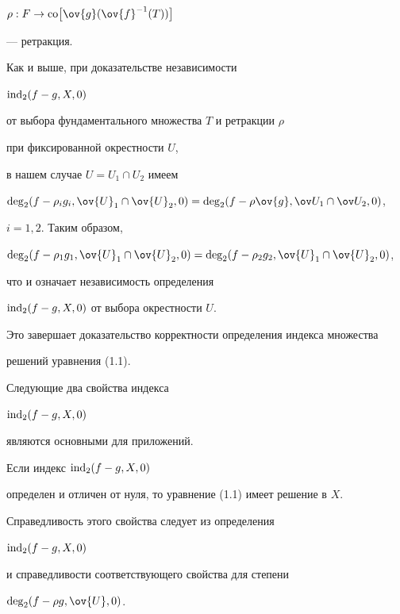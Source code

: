 $\rho : F \to\co  \bigl[\ov {g} (\ov {f}^{-1}(T)) \bigr]$


--- ретракция.


Как и выше, при доказательстве независимости 


$\operatorname{ind}_2 (f - g, X, 0)$


от выбора фундаментального множества $T$ и ретракции $\rho$


при фиксированной окрестности $U$,


в нашем случае $U = U_1 \cap U_2$ имеем


$\Deg_2 (f - \rho_i g_i, \ov {U}_1 \cap \ov {U}_2, 0) =


\Deg_2 (f - \rho \ov {g}, \ov U_1 \cap \ov U_2, 0)$,


$i = 1,2$. Таким образом,


$\Deg_2 (f - \rho_1 g_1, \ov {U}_1 \cap


\ov {U}_2, 0) = \Deg_2 (f - \rho_2 g_2, \ov {U}_1 \cap


\ov {U}_2, 0)$,


что и означает независимость определения 


$\operatorname{ind}_2 (f - g, X, 0)$ от выбора окрестности $U$.


Это завершает доказательство корректности определения индекса множества


решений уравнения (1.1).





Следующие два свойства индекса 


$\operatorname{ind}_2 (f - g, X, 0)$


являются основными для приложений.





\begin{ptys}


Если индекс $\operatorname{ind}_2 (f - g, X, 0)$


определен и отличен от нуля, то уравнение (1.1) имеет решение в $X$.


\end{ptys}





Справедливость этого свойства следует из определения 


$\operatorname{ind}_2 (f - g, X, 0)$


и справедливости соответствующего свойства для степени


$\Deg_2 (f - \rho g, \ov {U}, 0)$.






